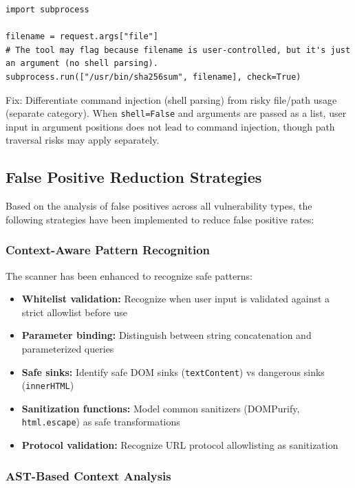 \begin{lstlisting}[style=pycode]
import subprocess

filename = request.args["file"]
# The tool may flag because filename is user-controlled, but it's just an argument (no shell parsing).
subprocess.run(["/usr/bin/sha256sum", filename], check=True)
\end{lstlisting}
Fix: Differentiate command injection (shell parsing) from risky file/path usage (separate category). When \texttt{shell=False} and arguments are passed as a list, user input in argument positions does not lead to command injection, though path traversal risks may apply separately.

\subsection{False Positive Reduction Strategies}
\label{sec:fp_reduction_strategies}

Based on the analysis of false positives across all vulnerability types, the following strategies have been implemented to reduce false positive rates:

\subsubsection{Context-Aware Pattern Recognition}
\label{sec:fp_context_aware}

The scanner has been enhanced to recognize safe patterns:
\begin{itemize}
	\item \textbf{Whitelist validation:} Recognize when user input is validated against a strict allowlist before use
	\item \textbf{Parameter binding:} Distinguish between string concatenation and parameterized queries
	\item \textbf{Safe sinks:} Identify safe DOM sinks (\texttt{textContent}) vs dangerous sinks (\texttt{innerHTML})
	\item \textbf{Sanitization functions:} Model common sanitizers (DOMPurify, \texttt{html.escape}) as safe transformations
	\item \textbf{Protocol validation:} Recognize URL protocol allowlisting as sanitization
\end{itemize}

\subsubsection{AST-Based Context Analysis}
\label{sec:fp_ast_context}

